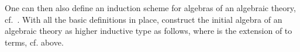 \documentclass{easychair}
\begin{document}
One can then also define an induction scheme for algebras of an algebraic
theory, cf.~\cite{HermidaJacobs97:IndCoindFib}.
With all the basic definitions in place, construct the initial algebra of
an algebraic theory as higher inductive type as follows, where
 \ofT
{}
\toA {}
is the extension of  to terms,
cf.  above.
\begin{code}%
\>[6]\AgdaSpace{}%
\>[13]\AgdaSymbol{:}\AgdaSpace{}%
\AgdaSpace{}%
\AgdaSymbol{\{}\AgdaSymbol{\}}\AgdaSpace{}%
\AgdaSymbol{(}\AgdaSpace{}%
\AgdaSymbol{:}\AgdaSpace{}%
\AgdaSpace{}%
\AgdaSpace{}%
\AgdaSpace{}%
\AgdaSymbol{)}\AgdaSpace{}%
\AgdaSpace{}%
\AgdaSpace{}%
\<%
\\
%
\>[6]%
\>[13]\AgdaSymbol{:}\AgdaSpace{}%
\AgdaSymbol{(}\AgdaSpace{}%
\AgdaSymbol{:}\AgdaSpace{}%
\AgdaSpace{}%
\sig\AgdaSymbol{)}\AgdaSpace{}%
\AgdaSymbol{(}\AgdaSpace{}%

\end{code}
\end{document}
